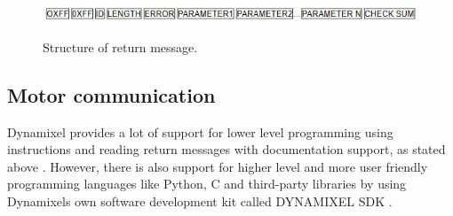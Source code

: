 \begin{figure}[H]
    \centering    
    \includegraphics[width=0.7\columnwidth]{chapters/img/return_packadge.JPG}
    \label{return}
    \caption{Structure of return message.}
\end{figure}

\subsection{Motor communication}
Dynamixel provides a lot of support for lower level programming using instructions and reading return messages with documentation support, as stated above
. However, there is also support for higher level and more user friendly programming languages like Python,
C and third-party libraries by using Dynamixels own software development kit called DYNAMIXEL SDK \cite{dynamixel_SDK}.


